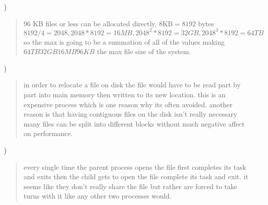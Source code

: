 \documentclass[11pt]{article}
\newenvironment{subquestion}[1]{#1) \begin{quote}}{\end{quote}}
\begin{document}
  \begin{subquestion}{12.16}
    96 KB files or less can be allocated directly, $8$KB$ = 8192$ bytes $8192/4= 2048, 2048 * 8192 = 16MB, 2048^2 * 8192 = 32GB, 2048^3 * 8192 = 64TB$ so the max is going to be
    a summation of all of the values making $64TB 32GB 16MB 96KB$ the max file size of the system.
  \end{subquestion}

  \begin{subquestion}{12.17}
    in order to relocate a file on disk the file would have to be read part by part into main memory then written to its new location. this is an expensive process which is one
    reason why its often avoided. another reason is that having contiguous files on the disk isn't really necessary many files can be split into different blocks without much
    negative affect on performance.
  \end{subquestion}

  \begin{subquestion}{7}
    every single time the parent process opens the file first completes its task and exits then the child gets to open the file complete its task and exit.
    it seems like they don't really share the file but rather are forced to take turns with it like any other two processes would.
  \end{subquestion}
\end{document}
